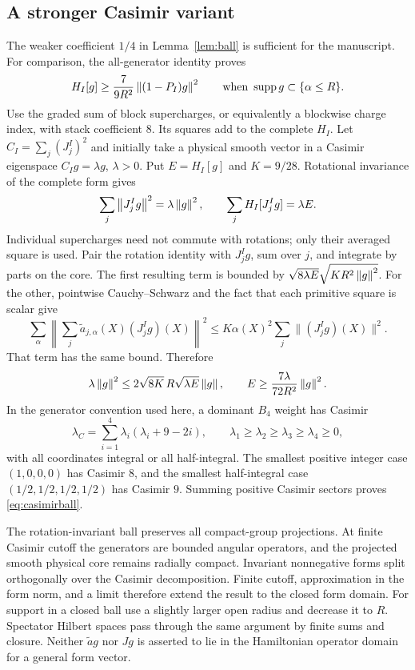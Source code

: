 \subsection{A stronger Casimir variant}
The weaker coefficient $1/4$ in Lemma~\ref{lem:ball} is sufficient for the manuscript. For comparison, the all-generator identity proves
\begin{equation}
 H_I[g]\ge\frac7{9R^2}\left\lVert (1-P_I)g\right\rVert^2
 \qquad\text{when }\operatorname{supp} g\subset\{\alpha\le R\}.\label{eq:casimirball}
\end{equation}
Use the graded sum of block supercharges, or equivalently a blockwise charge index, with stack coefficient $8$. Its squares add to the complete $H_I$. Let $C_I=\sum_j(J_j^I)^2$ and initially take a physical smooth vector in a Casimir eigenspace $C_Ig=\lambda g$, $\lambda>0$. Put $E=H_I[g]$ and $K=9/28$. Rotational invariance of the complete form gives
\begin{equation}
 \sum_j\left\lVert J_j^Ig\right\rVert^2=\lambda\left\lVert g\right\rVert^2,
 \qquad\sum_jH_I[J_j^Ig]=\lambda E.
\end{equation}
Individual supercharges need not commute with rotations; only their averaged square is used. Pair the rotation identity with $J_j^Ig$, sum over $j$, and integrate by parts on the core. The first resulting term is bounded by
$\sqrt{8\lambda E}\sqrt{KR^2\left\lVert g\right\rVert^2}$. For the other, pointwise Cauchy--Schwarz and the fact that each primitive square is scalar give
\begin{equation}
 \sum_\alpha\left\lVert\sum_j\widetilde a_{j,\alpha}(X)(J_j^Ig)(X)\right\rVert^2
 \le K\alpha(X)^2\sum_j\lVert(J_j^Ig)(X)\rVert^2.
\end{equation}
That term has the same bound. Therefore
\begin{equation}
 \lambda\left\lVert g\right\rVert^2\le2\sqrt{8K}\,R\sqrt{\lambda E}\left\lVert g\right\rVert,
 \qquad E\ge\frac{7\lambda}{72R^2}\left\lVert g\right\rVert^2.
\end{equation}
In the generator convention used here, a dominant $B_4$ weight has Casimir
\begin{equation}
 \lambda_C=\sum_{i=1}^4\lambda_i(\lambda_i+9-2i),\qquad
 \lambda_1\ge\lambda_2\ge\lambda_3\ge\lambda_4\ge0,
\end{equation}
with all coordinates integral or all half-integral. The smallest positive integer case $(1,0,0,0)$ has Casimir $8$, and the smallest half-integral case $(1/2,1/2,1/2,1/2)$ has Casimir $9$. Summing positive Casimir sectors proves \eqref{eq:casimirball}.

The rotation-invariant ball preserves all compact-group projections. At finite Casimir cutoff the generators are bounded angular operators, and the projected smooth physical core remains radially compact. Invariant nonnegative forms split orthogonally over the Casimir decomposition. Finite cutoff, approximation in the form norm, and a limit therefore extend the result to the closed form domain. For support in a closed ball use a slightly larger open radius and decrease it to $R$. Spectator Hilbert spaces pass through the same argument by finite sums and closure. Neither $\widetilde a g$ nor $Jg$ is asserted to lie in the Hamiltonian operator domain for a general form vector.

